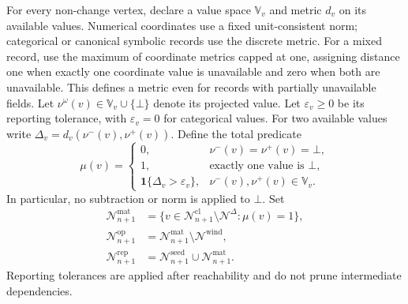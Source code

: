 For every non-change vertex, declare a value space $\mathbb V_v$ and metric
$d_v$ on its available values. Numerical coordinates use a fixed
unit-consistent norm; categorical or canonical symbolic records use the
discrete metric. For a mixed record, use the maximum of coordinate metrics
capped at one, assigning distance one when exactly one coordinate value is
unavailable and zero when both are unavailable. This defines a metric even
for records with partially unavailable fields.
Let $\nu^\omega(v)\in\mathbb V_v\cup\{\bot\}$ denote its projected value.
Let $\varepsilon_v\ge0$ be its reporting tolerance, with
$\varepsilon_v=0$ for categorical values. For two available values write
$\Delta_v=d_v(\nu^-(v),\nu^+(v))$. Define the total predicate
\begin{equation}
\mu(v)=
\begin{cases}
0,&\nu^-(v)=\nu^+(v)=\bot,\\
1,&\text{exactly one value is }\bot,\\
\mathbf 1\{\Delta_v>\varepsilon_v\},
 &\nu^-(v),\nu^+(v)\in\mathbb V_v.
\end{cases}
\label{eq:materiality}
\end{equation}
In particular, no subtraction or norm is applied to $\bot$.
Set
\begin{align}
\mathcal N_{n+1}^{\mathrm{mat}}
&=\{v\in\mathcal N_{n+1}^{\mathrm{cl}}\setminus\mathcal N^\Delta:
\mu(v)=1\},
\label{eq:material_support}\\
\mathcal N_{n+1}^{\mathrm{op}}
&=\mathcal N_{n+1}^{\mathrm{mat}}\setminus\mathcal N^{\mathrm{wind}},
\label{eq:operational_support}\\
\mathcal N_{n+1}^{\mathrm{rep}}
&=\mathcal N_{n+1}^{\mathrm{seed}}\cup\mathcal N_{n+1}^{\mathrm{mat}}.
\label{eq:reportable_support}
\end{align}
Reporting tolerances are applied after reachability and do not prune
intermediate dependencies.

